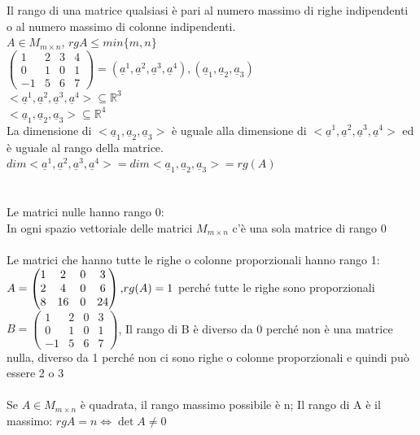 Il rango di una matrice qualsiasi è pari al numero massimo di righe indipendenti o al numero massimo di colonne indipendenti.\\
$A\in M_{m\times n}$, $rgA\leqslant min\{m,n\}$\\
$\begin{pmatrix}
	1 & 2 & 3 & 4\\
	0 & 1 & 0 & 1\\
	-1 & 5 & 6 & 7
\end{pmatrix}=(\underline{a}^1, \underline{a}^2, \underline{a}^3, \underline{a}^4), (\underline{a}_1,\underline{a}_2,\underline{a}_3)$\\
$<\underline{a}^1, \underline{a}^2, \underline{a}^3, \underline{a}^4>\subseteq\mathbb{R}^3$\\
$<\underline{a}_1,\underline{a}_2,\underline{a}_3>\subseteq\mathbb{R}^4$\\
La dimensione di $<\underline{a}_1,\underline{a}_2,\underline{a}_3>$ è uguale alla dimensione di $<\underline{a}^1, \underline{a}^2, \underline{a}^3, \underline{a}^4>$ ed è uguale al rango della matrice.\\
$dim<\underline{a}^1, \underline{a}^2, \underline{a}^3, \underline{a}^4>=dim<\underline{a}_1,\underline{a}_2,\underline{a}_3>=rg(A)$\\\\\\
Le matrici nulle hanno rango 0:\\
In ogni spazio vettoriale delle matrici $M_{m\times n}$ c'è una sola matrice di rango 0\\\\
Le matrici che hanno tutte le righe o colonne proporzionali hanno rango 1:\\
$A=\begin{pmatrix}
	1 & 2 & 0 & 3\\
	2 & 4 & 0 & 6\\
	8 & 16 & 0 & 24
\end{pmatrix}\textnormal{,} rg(A)=1$ perché tutte le righe sono proporzionali\\
$B=\begin{pmatrix}
	1 & 2 & 0 & 3\\
	0 & 1 & 0 & 1\\
	-1 & 5 & 6 & 7
\end{pmatrix}$, Il rango di B è diverso da 0 perché non è una matrice nulla, diverso da 1 perché non ci sono righe o colonne proporzionali e quindi può essere 2 o 3\\\\
Se $A\in M_{m\times n}$ è quadrata, il rango massimo possibile è n; Il rango di A è il massimo: $rgA=n\Leftrightarrow \det A\neq 0$

